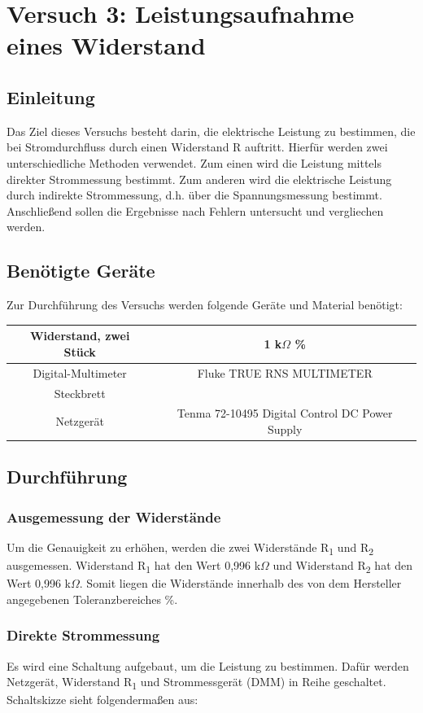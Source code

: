 \chapter{Versuch 3: Leistungsaufnahme eines Widerstand}

\section{Einleitung}
Das Ziel dieses Versuchs besteht darin, die elektrische Leistung zu bestimmen,
die bei Stromdurchfluss durch einen Widerstand R auftritt. Hierfür werden zwei 
unterschiedliche Methoden verwendet. Zum einen wird die Leistung mittels 
direkter Strommessung bestimmt. Zum anderen wird die elektrische Leistung durch
indirekte Strommessung, d.h. über die Spannungsmessung bestimmt. Anschließend 
sollen die Ergebnisse nach Fehlern untersucht und vergliechen werden.

\section{Benötigte Geräte}
Zur Durchführung des Versuchs werden folgende Geräte und Material benötigt:

\begin{tabular}[h]{c|c}
	Widerstand, zwei Stück & 1 k$\Omega$ \textpm 5\% \\
    \hline
    Digital-Multimeter & Fluke TRUE RNS MULTIMETER\\
    \hline
    Steckbrett & \\
    \hline
    Netzgerät & Tenma 72-10495 Digital Control DC Power Supply
    \label{tab:Versuch 3: Geräte}
\end{tabular}

\section{Durchführung}
\subsection{Ausgemessung der Widerstände}
Um die Genauigkeit zu erhöhen, werden die zwei Widerstände R\textsubscript{1}
und R\textsubscript{2} ausgemessen. Widerstand R\textsubscript{1} hat den 
Wert 0,996 k$\Omega$ und Widerstand R\textsubscript{2} hat den Wert 0,996 
k$\Omega$. Somit liegen die Widerstände innerhalb des von dem Hersteller
angegebenen Toleranzbereiches \%. 

\subsection{Direkte Strommessung}
Es wird eine Schaltung aufgebaut, um die Leistung zu bestimmen. Dafür werden
Netzgerät, Widerstand R\textsubscript{1} und Strommessgerät (DMM) in Reihe
geschaltet. Schaltskizze sieht folgendermaßen aus:

